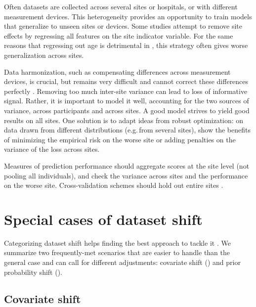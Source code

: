 \documentclass[a4paper,num-refs]{oup-contemporary}
\newcommand{\eg}{e.g.\,}
\begin{document}
Often datasets are collected across several sites or hospitals, or with
different measurement devices. This heterogeneity
provides an opportunity to train models that generalize to
unseen sites or devices. Some studies attempt to remove site effects by
regressing all features on the site indicator variable. For the same reasons
that regressing out age is detrimental in , this
strategy often gives worse generalization across sites.

Data harmonization, such as compensating differences across measurement devices, is crucial, but remains very difficult and cannot correct these differences perfectly \citep{glocker2019machine}.
%
Removing too much inter-site variance can lead to loss of informative
signal. Rather, it is important to model it well, accounting for the two
sources of variance, across participants and across sites. A good model
strives to yield good results on all sites. One solution is to adapt
ideas from robust optimization: on data drawn from different
distributions (\eg from several sites), \citet{krueger2020out} show the
benefits of
minimizing the empirical risk on the worse site or adding penalties on the
variance of the loss across sites.

Measures of prediction performance should aggregate scores at
the site level (not pooling all individuals), and check the variance across
sites and the performance on the worse site. Cross-validation schemes should
hold out entire sites \citep{woo2017building,little2017using}.
%


\section{Special cases of dataset shift}

Categorizing dataset shift helps finding the best approach to tackle it
\cite{storkey2009training,moreno2012unifying}.
%
We summarize two frequently-met scenarios that are easier to handle than the general case and can call for different adjustments: covariate shift () and prior probability shift ().
%

\subsection{Covariate shift}
\label{sec:covariate-shift}
\end{document}
